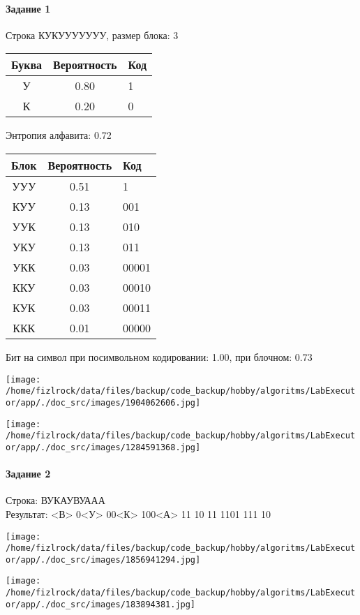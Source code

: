 \documentclass[a4paper, 12pt]{article}
\begin{document}
\paragraph{Задание 1}

Строка КУКУУУУУУУ, размер блока: 3
\begin{center}
 \begin{tabular}{ |c|c|l| } 
  \hline
     Буква & Вероятность & Код\\ \hline
У & 0.80 & 1\\\hline
К & 0.20 & 0
\\ \hline \end{tabular}
\end{center}
Энтропия алфавита: 0.72
\begin{center}
 \begin{tabular}{ |c|c|l| } 
  \hline
     Блок & Вероятность & Код\\ \hline
УУУ & 0.51 & 1\\\hline
КУУ & 0.13 & 001\\\hline
УУК & 0.13 & 010\\\hline
УКУ & 0.13 & 011\\\hline
УКК & 0.03 & 00001\\\hline
ККУ & 0.03 & 00010\\\hline
КУК & 0.03 & 00011\\\hline
ККК & 0.01 & 00000
\\ \hline \end{tabular}
\end{center}
Бит на символ при посимвольном кодировании: 1.00, при блочном: 0.73

\texttt{[image: /home/fizlrock/data/files/backup/code\_backup/hobby/algoritms/LabExecutor/app/./doc\_src/images/1904062606.jpg]}

\texttt{[image: /home/fizlrock/data/files/backup/code\_backup/hobby/algoritms/LabExecutor/app/./doc\_src/images/1284591368.jpg]}
\pagebreak
\paragraph{Задание 2}

Строка: 
ВУКАУВУААА\\
Результат: <В> 0<У> 00<К> 100<А> 11 10 11 1101 111 10

\texttt{[image: /home/fizlrock/data/files/backup/code\_backup/hobby/algoritms/LabExecutor/app/./doc\_src/images/1856941294.jpg]}

\texttt{[image: /home/fizlrock/data/files/backup/code\_backup/hobby/algoritms/LabExecutor/app/./doc\_src/images/183894381.jpg]}
\end{document}
